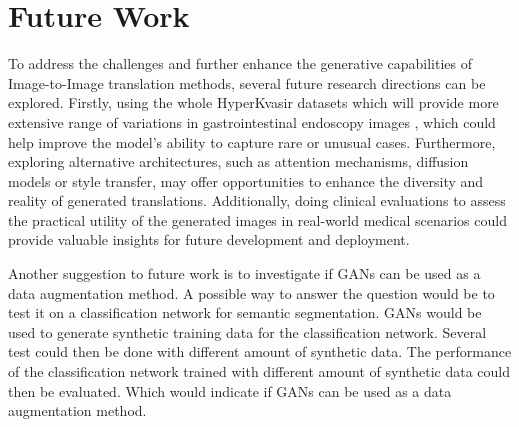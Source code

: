 \documentclass[UKenglish,12pt]{master-style}
\begin{document}
\section{Future Work} 
To address the challenges and further enhance the generative capabilities of Image-to-Image translation methods, several future research directions can be explored. Firstly, using the whole HyperKvasir datasets which will provide more extensive range of variations in gastrointestinal endoscopy images , which could help improve the model's ability to capture rare or unusual cases. Furthermore, exploring alternative architectures, such as attention mechanisms, diffusion models or style transfer, may offer opportunities to enhance the diversity and reality of generated translations. Additionally, doing clinical evaluations to assess the practical utility of the generated images in real-world medical scenarios could provide valuable insights for future development and deployment.

Another suggestion to future work is to investigate if GANs can be used as a data augmentation method. A possible way to answer the question would be to test it on a classification network for semantic segmentation. GANs would be used to generate synthetic training data for the classification network. Several test could then be done with different amount of synthetic data. The performance of the classification network trained with different amount of synthetic data could then be evaluated. Which would indicate if GANs can be used as a data augmentation method.
\end{document}
